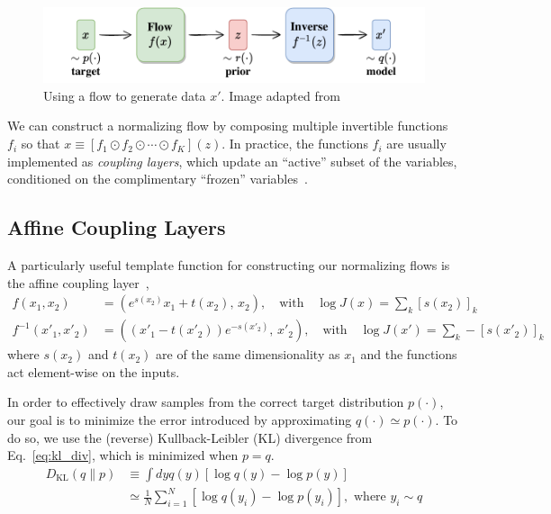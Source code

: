 \documentclass[a4paper,11pt]{article}
\begin{document}
\begin{figure}[htpb]
    \centering
    \includegraphics[width=\textwidth]{assets/flow_model.pdf}
    \caption{\label{fig:flow_model} Using a flow to generate data \(x'\). Image
    adapted from~\cite{weng2018flow}}
\end{figure}
%
We can construct a normalizing flow by composing multiple invertible functions
\(f_{i}\) so that \(x\equiv \left[f_{1}\odot f_{2}\odot \cdots \odot
f_{K}\right](z)\).
%
In practice, the functions \(f_{i}\) are usually implemented as \emph{coupling
layers}, which update an ``active'' subset of the variables, conditioned on the
complimentary ``frozen'' variables~\cite{Kanwar:2020xzo,Albergo:2021vyo}.
%
\subsection{\label{subsec:coupling_layers}Affine Coupling Layers}
A particularly useful template function for constructing our normalizing flows
is the affine coupling layer~\cite{DinhSB16,rezende2015variational},
%
\begin{align*}
    f(x_{1}, x_{2}) &= \left(e^{s(x_2)}x_{1} + t(x_{2}),\, x_{2}\right),
        \quad\text{with}\quad \log J(x) = \sum_{k}\left[s(x_{2})\right]_{k}\\
    f^{-1}(x'_{1}, x'_{2}) &= \left((x'_{1}-t(x'_{2}))e^{-s(x'_{2})},\, x'_{2}\right),
        \quad\text{with}\quad \log J(x') = \sum_{k}-\left[s(x'_{2})\right]_{k}
\end{align*}
%
where \(s(x_{2})\) and \(t(x_{2})\) are of the same dimensionality as \(x_{1}\)
and the functions act element-wise on the inputs.

In order to effectively draw samples from the correct target distribution
\(p(\cdot)\), our goal is to minimize the error introduced by approximating
\(q(\cdot)\simeq p(\cdot)\).
%
To do so, we use the (reverse) Kullback-Leibler (KL) divergence from
Eq.~\ref{eq:kl_div}, which is minimized when \(p=q\).
%
\begin{align}
    \label{eq:kl_div}
    D_{\mathrm{KL}}(q\|p) 
    &\equiv\int dy q(y)\left[\log q(y) - \log p(y)\right]\\
    &\simeq \frac{1}{N}\sum_{i=1}^{N} \left[\log q(y_{i})-\log p(y_{i})\right],
        \,\,\text{where}\,\, y_{i}\sim q
\end{align}
%
\end{document}
